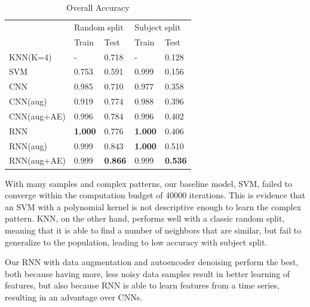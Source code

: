 \documentclass{article}
\begin{document}
\begin{multicols*}{2}
\begin{table}[H]
\centering
\begin{tabular}{lllll}
\hline
            & \multicolumn{2}{l}{Random split} & \multicolumn{2}{l}{Subject split} \\ 
            & Train           & Test           & Train           & Test            \\ \hline
KNN(K=4)    & -               & 0.718          & -               & 0.128           \\
SVM         & 0.753           & 0.591          & 0.999           & 0.156           \\
CNN         & 0.985           & 0.710          & 0.977           & 0.358           \\
CNN(aug)    & 0.919           & 0.774          & 0.988           & 0.396           \\
CNN(aug+AE) & 0.996           & 0.784          & 0.996           & 0.402           \\
RNN         & \textbf{1.000}           & 0.776          & \textbf{1.000}           & 0.406           \\
RNN(aug)    & 0.999           & 0.843          & \textbf{1.000}           & 0.510           \\
RNN(aug+AE) & 0.999           & \textbf{0.866}          & 0.999           & \textbf{0.536}           \\ \hline
\end{tabular}
\vspace{3pt}
\caption{Overall Accuracy}
\label{tab:overall-acc}
\end{table}

\vspace{-15pt}

With many samples and complex patterns, our baseline model, SVM, failed to converge within the computation budget of 40000 iterations. This is evidence that an SVM with a polynomial kernel is not descriptive enough to learn the complex pattern. KNN, on the other hand, performs well with a classic random split, meaning that it is able to find a number of neighbors that are similar, but fail to generalize to the population, leading to low accuracy with subject split. 

Our RNN with data augmentation and autoencoder denoising perform the best, both because having more, less noisy data samples result in better learning of features, but also because RNN is able to learn features from a time series, resulting in an advantage over CNNs.


\end{multicols*}
\end{document}
